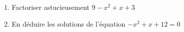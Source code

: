 
\begin{enumerate}
\item Factoriser astucieusement $9-x^2+x+3$
\item En déduire les solutions de l'équation $-x^2+x+12=0$
\end{enumerate}